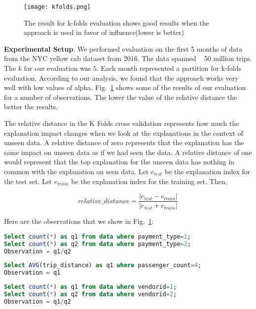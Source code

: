 \begin{figure}[h]
\texttt{[image: kfolds.png]}
\caption{The result for k-folds evaluation shows good results when the approach is used in favor of influence(lower is better)}
\label{fig:kfolds}
\end{figure}

\textbf{Experimental Setup}. We performed evaluation on the first 5 months of data from the NYC yellow cab dataset from 2016. The data spanned ~ 50 million trips. The $k$ for our evaluation was $5$. Each month represented a partition for k-folds evaluation. According to our analysis, we found that the approach works very well with low values of alpha. Fig.~\ref{fig:kfolds} shows some of the results of our evaluation for a number of observations. The lower the value of the relative distance the better the results.

The relative distance in the K Folds cross validation represents how much the explanation impact changes when we look at the explanations in the context of unseen data. A relative distance of zero represents that the explanation has the same impact on unseen data as if we had seen the data. A relative distance of one would represent that the top explanation for the unseen data has nothing in common with the explanation on seen data. Let $e_{test}$ be the explanation index for the test set. Let $e_{train}$ be the explanation index for the training set. Then,

$$relative\_distance = \frac{|e_{test}-e_{train}|}{|e_{test}+e_{train}|}$$

Here are the observations that we show in Fig.~\ref{fig:kfolds}:
\renewcommand{\lstlistingname}{Query}%
\begin{lstlisting}[language=SQL, caption=o1 for Fig.~\ref{fig:kfolds}, label=qry:o1]
Select count(*) as q1 from data where payment_type=1;
Select count(*) as q2 from data where payment_type=2;
Observation = q1/q2
\end{lstlisting}

\begin{lstlisting}[language=SQL, caption=o2 for Fig.~\ref{fig:kfolds}, label=qry:o2]
Select AVG(trip_distance) as q1 where passenger_count=4;
Observation = q1
\end{lstlisting}

\begin{lstlisting}[language=SQL, caption=o3 for Fig.~\ref{fig:kfolds}, label=qry:o3]
Select count(*) as q1 from data where vendorid=1;
Select count(*) as q2 from data where vendorid=2;
Observation = q1/q2
\end{lstlisting}

